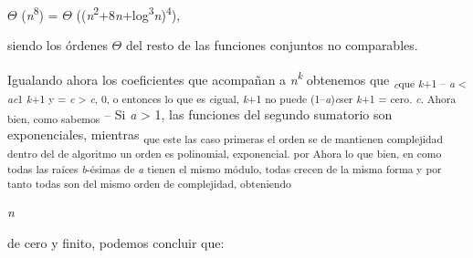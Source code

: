 \documentclass[12pt]{article}
\renewcommand{\_}{\kern-1.5pt\textunderscore\kern-1.5pt}
\begin{document}
\begin{adjustwidth}{2.3in}{2.29in}
{\fontsize{10pt}{12.0pt}\selectfont $ \Theta $ (\textit{n}\textsuperscript{8}) = $ \Theta $ ((\textit{n}\textsuperscript{2}+8\textit{n}+log\textsuperscript{3}\textit{n})\textsuperscript{4}), \par}\par

\end{adjustwidth}

\begin{adjustwidth}{0.77in}{0.96in}
{\fontsize{10pt}{12.0pt}\selectfont siendo los órdenes $ \Theta $  del resto de las funciones conjuntos no comparables. \par}\par

\end{adjustwidth}

\begin{Center}
{\fontsize{10pt}{12.0pt}\selectfont Igualando ahora los coeficientes que acompañan a \textit{n\textsuperscript{k }}obtenemos que \textit{\textsubscript{c}}\textsubscript{que \textit{k}+1 – \textit{a }< \textit{ac}1 \textit{k}+1 y = \textit{c }> \textit{c}, 0, o entonces lo que es \textit{c}igual, \textit{k}+1 no puede (1–\textit{a})\textit{c}ser \textit{k}+1 = cero. \textit{c}. Ahora bien, como sabemos }– Si \textit{a }> 1, las funciones del segundo sumatorio son exponenciales, mientras \textsubscript{que este las caso primeras el orden se de mantienen complejidad dentro del de algoritmo un orden es polinomial, exponencial. por Ahora lo que bien, en como todas las raíces \textit{b}-ésimas de \textit{a }tienen el mismo módulo, todas crecen de la misma forma y por tanto todas son del mismo orden de complejidad, obteniendo }\par}
\end{Center}\par

{\fontsize{7pt}{8.4pt}\selectfont \textit{n }{\fontsize{10pt}{12.0pt}\selectfont de cero y finito, podemos concluir que: \par}\par}\par
\end{document}
